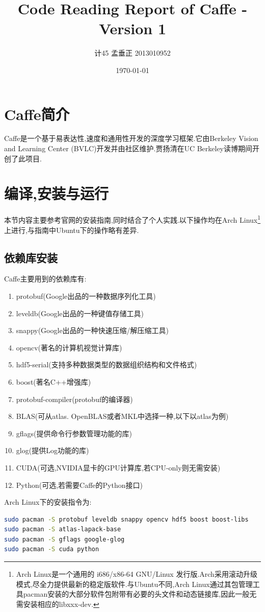 \documentclass[a4paper]{article}
\title{Code Reading Report of Caffe - Version 1}
\author{计45 孟垂正 2013010952}
\date{\today}
\begin{document}
	\maketitle
	\section{Caffe简介}
	Caffe是一个基于易表达性,速度和通用性开发的深度学习框架.它由Berkeley Vision and Learning Center (BVLC)开发并由社区维护.贾扬清在UC Berkeley读博期间开创了此项目\cite{jia2014caffe}.
	
	\section{编译,安装与运行}
	本节内容主要参考官网的安装指南\cite{installationguide},同时结合了个人实践.以下操作均在Arch Linux\footnote{Arch Linux是一个通用的 i686/x86-64 GNU/Linux 发行版.Arch采用滚动升级模式,尽全力提供最新的稳定版软件.与Ubuntu不同,Arch Linux通过其包管理工具pacman安装的大部分软件包附带有必要的头文件和动态链接库,因此一般无需安装相应的libxxx-dev.}上进行,与指南中Ubuntu下的操作略有差异.
	\subsection{依赖库安装}
	Caffe主要用到的依赖库有:
	\begin{enumerate}[-]
		\item protobuf(Google出品的一种数据序列化工具)
		\item leveldb(Google出品的一种键值存储工具)
		\item snappy(Google出品的一种快速压缩/解压缩工具)
		\item opencv(著名的计算机视觉计算库)
		\item hdf5-serial(支持多种数据类型的数据组织结构和文件格式)
		\item boost(著名C++增强库)
		\item protobuf-compiler(protobuf的编译器)
		\item BLAS(可从atlas. OpenBLAS或者MKL中选择一种,以下以atlas为例)
		\item gflags(提供命令行参数管理功能的库)
		\item glog(提供Log功能的库)
		\item CUDA(可选,NVIDIA显卡的GPU计算库,若CPU-only则无需安装)
		\item Python(可选,若需要Caffe的Python接口)
	\end{enumerate}
	Arch Linux下的安装指令为:
	\begin{lstlisting}[language=bash]
sudo pacman -S protobuf leveldb snappy opencv hdf5 boost boost-libs
sudo pacman -S atlas-lapack-base
sudo pacman -S gflags google-glog
sudo pacman -S cuda python
	\end{lstlisting}
\end{document}
